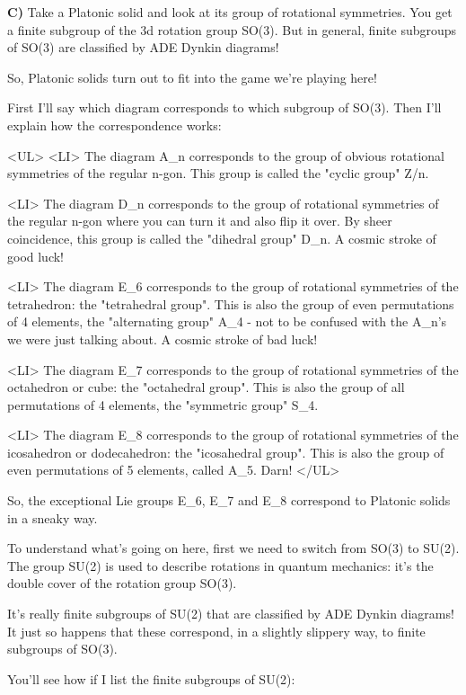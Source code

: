 \textbf{C)} 
Take a Platonic solid and look at its group of rotational symmetries.
You get a finite subgroup of the 3d rotation group SO(3).  But in 
general, finite subgroups of SO(3) are classified by ADE Dynkin 
diagrams!  

So, Platonic solids turn out to fit into the game we're playing here!

First I'll say which diagram corresponds to which subgroup of SO(3).
Then I'll explain how the correspondence works:

<UL>
<LI>
 The diagram A_{n} corresponds to the group of obvious rotational symmetries
  of the regular n-gon.  This group is called the "cyclic group" Z/n.

<LI>
 The diagram D_{n} corresponds to the group of rotational symmetries 
  of the regular n-gon where you can turn it and also flip it over.
  By sheer coincidence, this group is called the "dihedral group" D_{n}. 
  A cosmic stroke of good luck!

<LI>
 The diagram E_{6} corresponds to the group of rotational symmetries 
  of the tetrahedron: the "tetrahedral group".  This is also the 
  group of even permutations of 4 elements, the "alternating group"
  A_{4} - not to be
  confused with the A_{n}'s we were just talking about.  A cosmic 
  stroke of bad luck!

<LI>
 The diagram E_{7} corresponds to the group of rotational symmetries
  of the octahedron or cube: the "octahedral group".  This is also 
  the group of all permutations of 4 elements, the "symmetric
  group" S_{4}.  

<LI>
 The diagram E_{8} corresponds to the group of rotational symmetries
  of the icosahedron or dodecahedron: the "icosahedral group".  This 
  is also the group of even permutations of 5 elements, called A_{5}.  
 Darn!
</UL>

So, the exceptional Lie groups E_{6}, E_{7} and E_{8} correspond to Platonic
solids in a sneaky way.  

To understand what's going on here, first we need to switch from SO(3)
to SU(2).  The group SU(2) is used to describe rotations in quantum 
mechanics: it's the double cover of the rotation group SO(3).  

It's really finite subgroups of SU(2) that are classified by ADE Dynkin 
diagrams!   It just so happens that these correspond, in a slightly
slippery way, to finite subgroups of SO(3).  

You'll see how if I list the finite subgroups of SU(2): 

